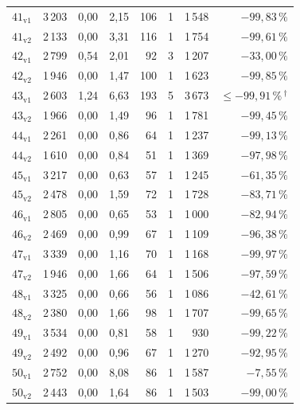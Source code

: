 \begin{longtable}{@{}l r r r r r r r@{}}
  \endlastfoot
  $\mathrm{41_{v1}}$ & 3\,203 & 0{,}00 & 2{,}15 & 106 & 1 & 1\,548 & $-99{,}83\,\%$ \\
  $\mathrm{41_{v2}}$ & 2\,133 & 0{,}00 & 3{,}31 & 116 & 1 & 1\,754 & $-99{,}61\,\%$ \\
  $\mathrm{42_{v1}}$ & 2\,799 & 0{,}54 & 2{,}01 & 92 & 3 & 1\,207 & $-33{,}00\,\%$ \\
  $\mathrm{42_{v2}}$ & 1\,946 & 0{,}00 & 1{,}47 & 100 & 1 & 1\,623 & $-99{,}85\,\%$ \\
  $\mathrm{43_{v1}}$ & 2\,603 & 1{,}24 & 6{,}63 & 193 & 5 & 3\,673 & $\leq -99{,}91\,\%$\,$^{\dagger}$ \\
  $\mathrm{43_{v2}}$ & 1\,966 & 0{,}00 & 1{,}49 & 96 & 1 & 1\,781 & $-99{,}45\,\%$ \\
  $\mathrm{44_{v1}}$ & 2\,261 & 0{,}00 & 0{,}86 & 64 & 1 & 1\,237 & $-99{,}13\,\%$ \\
  $\mathrm{44_{v2}}$ & 1\,610 & 0{,}00 & 0{,}84 & 51 & 1 & 1\,369 & $-97{,}98\,\%$ \\
  $\mathrm{45_{v1}}$ & 3\,217 & 0{,}00 & 0{,}63 & 57 & 1 & 1\,245 & $-61{,}35\,\%$ \\
  $\mathrm{45_{v2}}$ & 2\,478 & 0{,}00 & 1{,}59 & 72 & 1 & 1\,728 & $-83{,}71\,\%$ \\
  $\mathrm{46_{v1}}$ & 2\,805 & 0{,}00 & 0{,}65 & 53 & 1 & 1\,000 & $-82{,}94\,\%$ \\
  $\mathrm{46_{v2}}$ & 2\,469 & 0{,}00 & 0{,}99 & 67 & 1 & 1\,109 & $-96{,}38\,\%$ \\
  $\mathrm{47_{v1}}$ & 3\,339 & 0{,}00 & 1{,}16 & 70 & 1 & 1\,168 & $-99{,}97\,\%$ \\
  $\mathrm{47_{v2}}$ & 1\,946 & 0{,}00 & 1{,}66 & 64 & 1 & 1\,506 & $-97{,}59\,\%$ \\
  $\mathrm{48_{v1}}$ & 3\,325 & 0{,}00 & 0{,}66 & 56 & 1 & 1\,086 & $-42{,}61\,\%$ \\
  $\mathrm{48_{v2}}$ & 2\,380 & 0{,}00 & 1{,}66 & 98 & 1 & 1\,707 & $-99{,}65\,\%$ \\
  $\mathrm{49_{v1}}$ & 3\,534 & 0{,}00 & 0{,}81 & 58 & 1 & 930 & $-99{,}22\,\%$ \\
  $\mathrm{49_{v2}}$ & 2\,492 & 0{,}00 & 0{,}96 & 67 & 1 & 1\,270 & $-92{,}95\,\%$ \\
  $\mathrm{50_{v1}}$ & 2\,752 & 0{,}00 & 8{,}08 & 86 & 1 & 1\,587 & $-7{,}55\,\%$ \\
  $\mathrm{50_{v2}}$ & 2\,443 & 0{,}00 & 1{,}64 & 86 & 1 & 1\,503 & $-99{,}00\,\%$ \\
\end{longtable}
\endgroup
